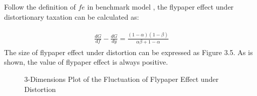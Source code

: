 Follow the definition of $fe$ in benchmark model , the flypaper effect under distortionary taxation can be calculated as:

\begin{align}
    \begin{split}
        \frac{d G}{d f}-\frac{d G}{d y}=\frac{(1-\alpha)(1-\beta)}{\alpha \beta+1-\alpha}  \label{feunderdistortion}
    \end{split}
\end{align}
The size of flypaper effect under distortion can be expressed as Figure 3.5. As is shown, the value of flypaper effect is always positive.
\begin{figure}[htbp]
    \centering
    \caption{3-Dimensions Plot of the Fluctuation of Flypaper Effect under Distortion}
    \label{figfeunderdistortion}
\end{figure}

